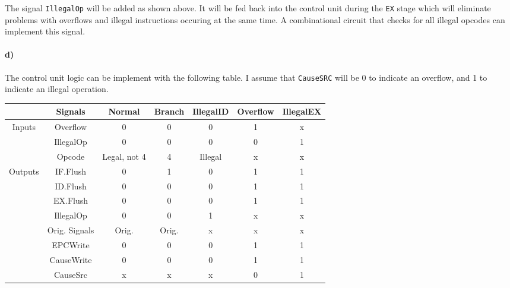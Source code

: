 \documentclass[12pt]{article}
\begin{document}
The signal \texttt{IllegalOp} will be added as shown above. It will be fed back into the control unit during the \texttt{EX} stage which will
eliminate problems with overflows and illegal instructions occuring at the same time. A combinational circuit that checks for all illegal opcodes
can implement this signal.

\paragraph{d)}

The control unit logic can be implement with the following table. I assume that \texttt{CauseSRC} will be 0 to indicate an overflow, and 1 to indicate an
illegal operation.

\begin{center}
        \hspace*{-4cm}
        \begin{tabular}{c|c|c|c|c|c|c}
                & Signals & Normal & Branch & IllegalID & Overflow & IllegalEX\\
                \hline
                \multirow{3}{*}{Inputs} & Overflow & 0 & 0 & 0 & 1 & x\\
                & IllegalOp & 0 & 0 & 0 & 0 & 1\\
                & Opcode & Legal, not 4 & 4 & Illegal & x & x\\
                \hline
                \multirow{8}{*}{Outputs} & IF.Flush & 0 & 1 & 0 & 1 & 1\\
                & ID.Flush & 0 & 0 & 0 & 1 & 1\\
                & EX.Flush & 0 & 0 & 0 & 1 & 1\\
                & IllegalOp & 0 & 0 & 1 & x & x\\
                & Orig. Signals & Orig. & Orig. & x & x & x\\
                & EPCWrite & 0 & 0 & 0 & 1 & 1\\
                & CauseWrite & 0 & 0 & 0 & 1 & 1\\
                & CauseSrc & x & x & x & 0 & 1
        \end{tabular}
        \hspace*{-4cm}
\end{center}
\end{document}
